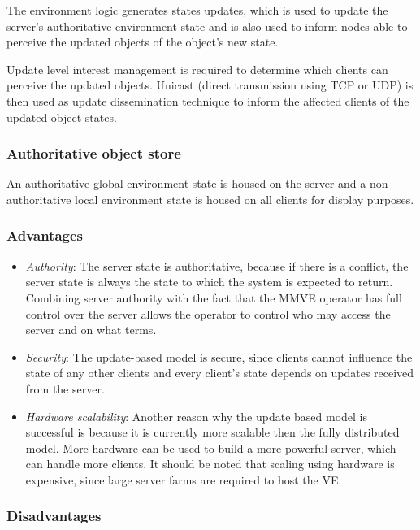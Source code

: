 The environment logic generates states updates, which is used to update the server's authoritative environment state and is also used to inform nodes able to perceive the updated objects of the object's new state.

Update level interest management is required to determine which clients can perceive the updated objects. Unicast (direct transmission using TCP or UDP) is then used as update dissemination technique to inform the affected clients of the updated object states.

\subsubsection{Authoritative object store}
An authoritative global environment state is housed on the server and a  non-authoritative local environment state is housed on all clients for display purposes.

\subsubsection{Advantages}

\begin{itemize}
\item \emph{Authority}: The server state is authoritative, because if there is a conflict, the server state is always the state to which the system is expected to return. Combining server authority with the fact that the MMVE operator has full control over the server allows the operator to control who may access the server and on what terms.

\item \emph{Security}: The update-based model is secure, since clients cannot influence the state of any other clients and every client's state depends on updates received from the server.

\item \emph{Hardware scalability}: Another reason why the update based model is successful is because it is currently more scalable then the fully distributed model. More hardware can be used to build a more powerful server, which can handle more clients. It should be noted that scaling using hardware is expensive, since large server farms are required to host the VE.
\end{itemize}

\subsubsection{Disadvantages}


